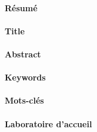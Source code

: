 {	\fancyhead[LE]{}
	\fancyhead[RE]{\slshape \rightmark}
	\fancyhead[LO]{\slshape \leftmark}
	\fancyhead[RO]{}
	
	\fancyfoot[C]{}
	\fancyfoot[LE]{\thepage}
	\fancyfoot[RE]{\BXnomcourt}
	\fancyfoot[LO]{\BXsujetcourt}
	\fancyfoot[RO]{\thepage}
	
	\paragraph*{Résumé} \BXresume
	
	\paragraph*{Title} \BXtitle
	
	\paragraph*{Abstract} \BXabstract
	
	\paragraph*{Keywords} \BXkeywords
	
	\paragraph*{Mots-clés} \BXmotscles
	
	\paragraph*{Laboratoire d'accueil} \BXlabo
}

\newcommand{\logoUB}{\texttt{[image: ../template/logo\_ubx.jpg]}}

\newcommand{\logoRhoban}{\texttt{[image: ../media/rhoban\_logo.png]}}

%
%

